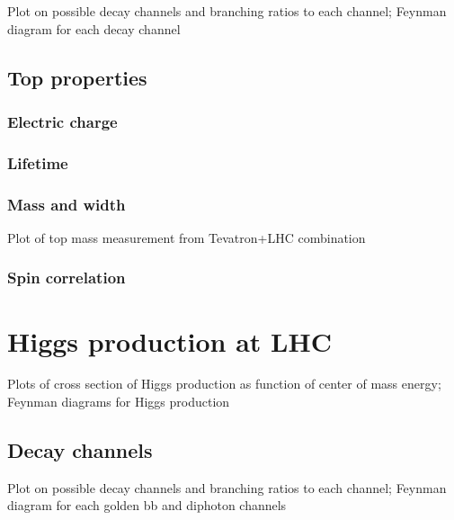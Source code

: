\begin{TOINCLUDE}Plot on possible decay channels and branching ratios to each channel; Feynman diagram for each decay channel\end{TOINCLUDE}

\subsection{Top properties}

\subsubsection{Electric charge}

\subsubsection{Lifetime}

\subsubsection{Mass and width}

\begin{TOINCLUDE}Plot of top mass measurement from Tevatron+LHC combination\end{TOINCLUDE}

\subsubsection{Spin correlation}

\section{Higgs production at LHC}

\begin{TOINCLUDE}Plots of cross section of Higgs production as function of center of mass energy; Feynman diagrams for Higgs production\end{TOINCLUDE}

\subsection{Decay channels}

\begin{TOINCLUDE}Plot on possible decay channels and branching ratios to each channel; Feynman diagram for each golden bb and diphoton channels\end{TOINCLUDE}


